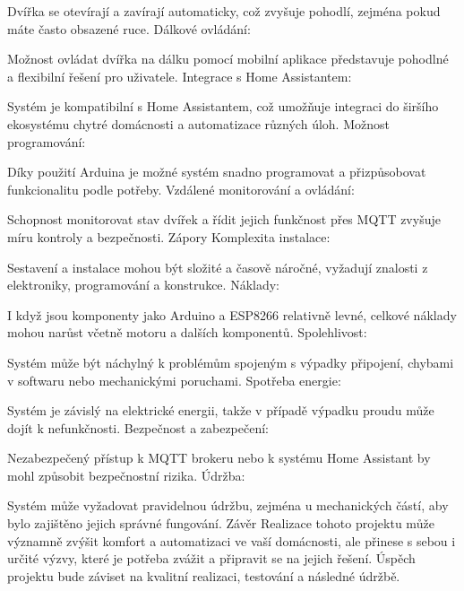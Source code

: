 Dvířka se otevírají a zavírají automaticky, což zvyšuje pohodlí, zejména pokud máte často obsazené ruce.
Dálkové ovládání:

Možnost ovládat dvířka na dálku pomocí mobilní aplikace představuje pohodlné a flexibilní řešení pro uživatele.
Integrace s Home Assistantem:

Systém je kompatibilní s Home Assistantem, což umožňuje integraci do širšího ekosystému chytré domácnosti a automatizace různých úloh.
Možnost programování:

Díky použití Arduina je možné systém snadno programovat a přizpůsobovat funkcionalitu podle potřeby.
Vzdálené monitorování a ovládání:

Schopnost monitorovat stav dvířek a řídit jejich funkčnost přes MQTT zvyšuje míru kontroly a bezpečnosti.
Zápory
Komplexita instalace:

Sestavení a instalace mohou být složité a časově náročné, vyžadují znalosti z elektroniky, programování a konstrukce.
Náklady:

I když jsou komponenty jako Arduino a ESP8266 relativně levné, celkové náklady mohou narůst včetně motoru a dalších komponentů.
Spolehlivost:

Systém může být náchylný k problémům spojeným s výpadky připojení, chybami v softwaru nebo mechanickými poruchami.
Spotřeba energie:

Systém je závislý na elektrické energii, takže v případě výpadku proudu může dojít k nefunkčnosti.
Bezpečnost a zabezpečení:

Nezabezpečený přístup k MQTT brokeru nebo k systému Home Assistant by mohl způsobit bezpečnostní rizika.
Údržba:

Systém může vyžadovat pravidelnou údržbu, zejména u mechanických částí, aby bylo zajištěno jejich správné fungování.
Závěr
Realizace tohoto projektu může významně zvýšit komfort a automatizaci ve vaší domácnosti, ale přinese s sebou i určité výzvy, které je potřeba zvážit a připravit se na jejich řešení. Úspěch projektu bude záviset na kvalitní realizaci, testování a následné údržbě.